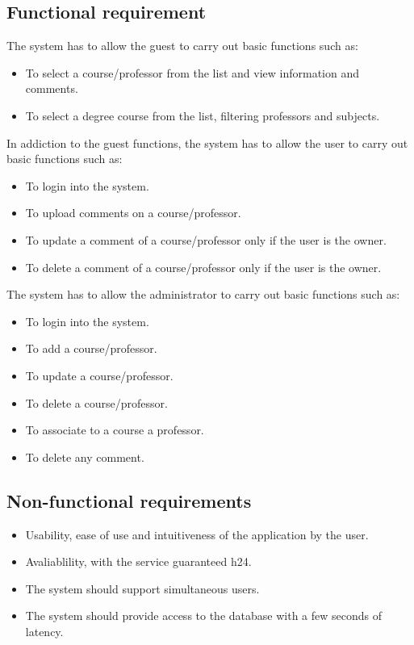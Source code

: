 \documentclass[a4paper, oneside]{article}
\begin{document}
\subsection{Functional requirement}
The system has to allow the guest to carry out basic functions such as:
\begin{itemize}
\item To select a course/professor from the list and view information and comments.
\item To select a degree course from the list, filtering professors and subjects.
\end{itemize}
In addiction to the guest functions, the system has to allow the user to carry out basic functions such as:
\begin{itemize}
\item To login into the system.
\item To upload comments on a course/professor.
\item To update a comment of a course/professor only if the user is the owner.
\item To delete a comment of a course/professor only if the user is the owner.
\end{itemize}
\vspace{2mm}
The system has to allow the administrator to carry out basic functions such as:
\begin{itemize}
\item To login into the system.
\item To add a course/professor.
\item To update a course/professor.
\item To delete a course/professor.
\item To associate to a course a professor.
\item To delete any comment.
\end{itemize}
\vspace{2mm}

\subsection{Non-functional requirements}
\begin{itemize}
\item Usability, ease of use and intuitiveness of the application by the user.
\item Avaliablility, with the service guaranteed h24.
\item The system should support simultaneous users.
\item The system should provide access to the database with a few seconds of latency.
\end{itemize}
\end{document}
